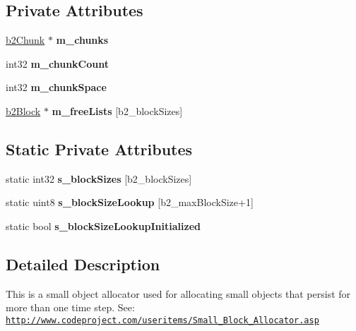 \subsection*{Private Attributes}
\begin{DoxyCompactItemize}
\item 
\mbox{\label{classb2BlockAllocator_a340443648b0c00b3e901fd5460759a0c}} 
\mbox{\hyperlink{structb2Chunk}{b2\+Chunk}} $\ast$ {\bfseries m\+\_\+chunks}
\item 
\mbox{\label{classb2BlockAllocator_a6f23a8eb32475bf1766ddd94a8c00b99}} 
int32 {\bfseries m\+\_\+chunk\+Count}
\item 
\mbox{\label{classb2BlockAllocator_ad4861c267d5d9392b10a2a0e44ec93e8}} 
int32 {\bfseries m\+\_\+chunk\+Space}
\item 
\mbox{\label{classb2BlockAllocator_af61bf3e75cc51ddbfbc5d10681b62df1}} 
\mbox{\hyperlink{structb2Block}{b2\+Block}} $\ast$ {\bfseries m\+\_\+free\+Lists} \mbox{[}b2\+\_\+block\+Sizes\mbox{]}
\end{DoxyCompactItemize}
\subsection*{Static Private Attributes}
\begin{DoxyCompactItemize}
\item 
static int32 {\bfseries s\+\_\+block\+Sizes} \mbox{[}b2\+\_\+block\+Sizes\mbox{]}
\item 
\mbox{\label{classb2BlockAllocator_a2a84d0454d9fa81534d7c463b2f24189}} 
static uint8 {\bfseries s\+\_\+block\+Size\+Lookup} \mbox{[}b2\+\_\+max\+Block\+Size+1\mbox{]}
\item 
\mbox{\label{classb2BlockAllocator_a8133162b02c5bb0d8a9abbcadd899524}} 
static bool {\bfseries s\+\_\+block\+Size\+Lookup\+Initialized}
\end{DoxyCompactItemize}


\subsection{Detailed Description}
This is a small object allocator used for allocating small objects that persist for more than one time step. See\+: \href{http://www.codeproject.com/useritems/Small_Block_Allocator.asp}{\tt http\+://www.\+codeproject.\+com/useritems/\+Small\+\_\+\+Block\+\_\+\+Allocator.\+asp} 

